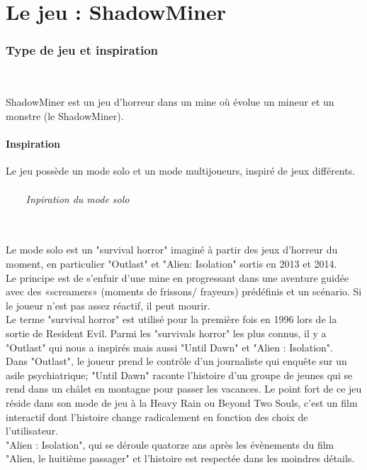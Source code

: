 \documentclass[titlepage, 13px, a4paper]{report}
\begin{document}
\newpage


\part{Le jeu : ShadowMiner}
\section{Type de jeu et inspiration}
\paragraph{} \hspace{0pt} \\
ShadowMiner est un jeu d’horreur dans un mine où évolue un mineur et un monstre (le ShadowMiner). \\

\subsection{Inspiration}
Le jeu possède un mode solo et un mode multijoueurs, inspiré de jeux différents. \\
\paragraph{~~~~Inpiration du mode solo} \hspace{0pt} \\
Le mode solo est un "survival horror" imaginé à partir des jeux d'horreur du moment, 
en particulier "Outlast" et "Alien: Isolation" sortis en 2013 et 2014. 
\\
Le principe est de s'enfuir d'une mine en progressant dans une aventure guidée 
avec des «screamers» (moments de frissons/ frayeurs) prédéfinis et un scénario. 
Si le joueur n'est pas assez réactif, il peut mourir.
\\
Le terme "survival horror" est utilisé pour la première fois en 1996 lors de la sortie 
de Resident Evil. Parmi les "survivals horror" les plus connus, il y a "Outlast" qui 
nous a inspirés mais aussi "Until Dawn" et "Alien : Isolation". 
\\
Dans "Outlast", le joueur prend le contrôle d'un journaliste qui enquête sur un asile psychiatrique; 
"Until Dawn" raconte l'histoire d'un groupe de jeunes qui se rend dans un châlet 
en montagne pour passer les vacances. Le point fort de ce jeu réside dans son mode 
de jeu à la Heavy Rain ou Beyond Two Souls, c'est un film interactif dont l'histoire 
change radicalement en fonction des choix de l'utilisateur. 
\\
"Alien : Isolation", qui se déroule quatorze ans après les évènements du film "Alien, le huitième passager" 
et l'histoire est respectée dans les moindres détails. \\ \\
\end{document}
